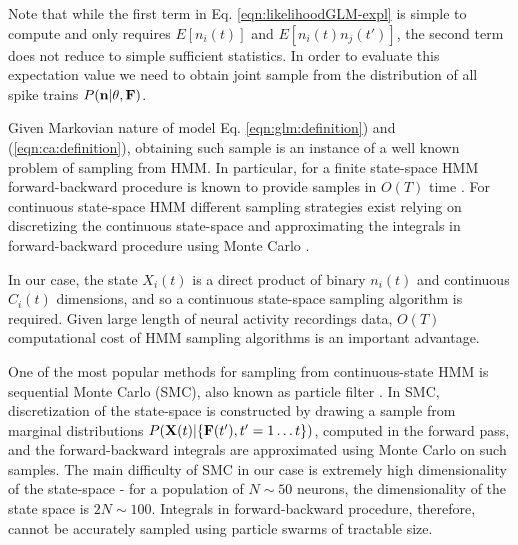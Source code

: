 Note that while the first term in Eq. \eqref{eqn:likelihoodGLM-expl} is simple to compute and only requires $E[n_i(t)]$ and $E[n_i(t) n_{j}(t')]$, the second term does not reduce to simple sufficient statistics. In order to evaluate this expectation value we need to obtain joint sample from the distribution of all spike trains $P({\bf n}|\mathbf{\theta}, {\bf F})$.

Given Markovian nature of model Eq. \eqref{eqn:glm:definition}) and (\ref{eqn:ca:definition}), obtaining such sample is an instance of a well known problem of sampling from HMM. In particular, for a finite state-space HMM forward-backward procedure is known to provide samples in  $O(T)$ time \cite{RAB89}. For continuous state-space HMM different sampling strategies exist relying on discretizing the continuous state-space and approximating the integrals in forward-backward procedure using Monte Carlo \cite{DFG01, MINKAPHD, Fearnhead2003, koyama08, Andrieu2007, NBR03}.

In our case, the state $X_i(t)$ is a direct product of binary $n_i(t)$ and continuous $C_i(t)$ dimensions, and so a continuous state-space sampling algorithm is required.
Given large length of neural activity recordings data, $O(T)$ computational cost of HMM sampling algorithms is an important advantage.

One of the most popular methods for sampling from continuous-state HMM is sequential Monte Carlo (SMC), also known as particle filter \cite{DFG01}. In SMC, discretization of the state-space is constructed by drawing a sample from marginal distributions  $P({\bf X}(t)|\{{\bf F}(t'), t'=1\ldots t\})$, computed in the forward pass, and the forward-backward integrals are approximated using Monte Carlo on such samples. The main difficulty of SMC in our case is extremely high dimensionality of the state-space - for a population of $N\sim 50$ neurons, the dimensionality of the state space is $2N\sim 100$. Integrals in forward-backward procedure, therefore, cannot be accurately sampled using particle swarms of tractable size.

